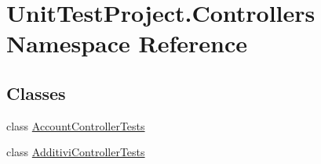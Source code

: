 \hypertarget{namespace_unit_test_project_1_1_controllers}{}\section{Unit\+Test\+Project.\+Controllers Namespace Reference}
\label{namespace_unit_test_project_1_1_controllers}
\subsection*{Classes}
\begin{DoxyCompactItemize}
\item 
class \mbox{\hyperlink{class_unit_test_project_1_1_controllers_1_1_account_controller_tests}{Account\+Controller\+Tests}}
\item 
class \mbox{\hyperlink{class_unit_test_project_1_1_controllers_1_1_additivi_controller_tests}{Additivi\+Controller\+Tests}}
\end{DoxyCompactItemize}
